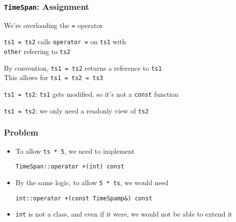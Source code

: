 \begin{frame}
  \frametitle{{\tt TimeSpan}: Assignment}

  
  \begin{overprint}
    \begin{center}
      We're overloading the {\tt =} operator.
    \end{center}

    \begin{center}
      {\tt ts1 = ts2} calls {\tt operator =} on {\tt ts1} with \\ {\tt other} referring to {\tt ts2}
    \end{center}

    \begin{center}
      By convention, {\tt ts1 = ts2} returns a reference to {\tt ts1} \\
      This allows for {\tt ts1 = ts2 = ts3}
    \end{center}

    \begin{center}
      {\tt ts1 = ts2}: {\tt ts1} gets modified, so it's not a {\tt const} function
    \end{center}

    \begin{center}
      {\tt ts1 = ts2}: we only need a readonly view of {\tt ts2}
    \end{center}
  \end{overprint}
\end{frame}

\begin{frame}
  \frametitle{Problem}
  \begin{itemize}
    \item To allow {\tt ts * 5}, we need to implement
          \begin{center}
            \tt TimeSpan::operator +(int) const
          \end{center}
    \item By the same logic, to allow {\tt 5 * ts}, we would need
          \begin{center}
            \tt int::operator +(const TimeSpamp\&) const
          \end{center}
    \item {\tt int} is not a class, and even if it were, we
          would not be able to extend it
  \end{itemize}
\end{frame}

